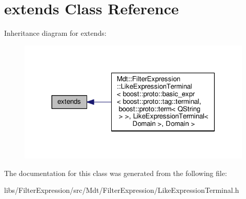 \hypertarget{classboost_1_1proto_1_1extends}{}\section{extends Class Reference}
\label{classboost_1_1proto_1_1extends}


Inheritance diagram for extends\+:
\nopagebreak
\begin{figure}[H]
\begin{center}
\leavevmode
\includegraphics[width=318pt]{classboost_1_1proto_1_1extends__inherit__graph}
\end{center}
\end{figure}


The documentation for this class was generated from the following file\+:\begin{DoxyCompactItemize}
\item 
libs/\+Filter\+Expression/src/\+Mdt/\+Filter\+Expression/Like\+Expression\+Terminal.\+h\end{DoxyCompactItemize}
